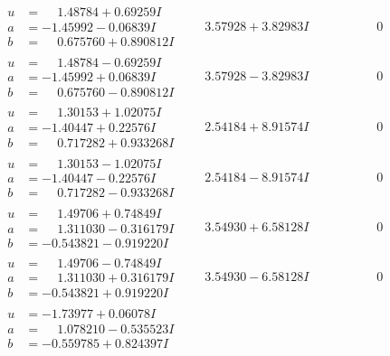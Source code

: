 \documentclass[1p]{elsarticle_modified}
\theoremstyle{definition}
\begin{document}
$$\begin{array}{c|c|c}
\begin{aligned}
u &= \phantom{-}1.48784 + 0.69259 I \\
a &= -1.45992 - 0.06839 I \\
b &= \phantom{-}0.675760 + 0.890812 I\end{aligned}
 & \phantom{-}3.57928 + 3.82983 I & \phantom{-0.000000 } 0 \\ \hline\begin{aligned}
u &= \phantom{-}1.48784 - 0.69259 I \\
a &= -1.45992 + 0.06839 I \\
b &= \phantom{-}0.675760 - 0.890812 I\end{aligned}
 & \phantom{-}3.57928 - 3.82983 I & \phantom{-0.000000 } 0 \\ \hline\begin{aligned}
u &= \phantom{-}1.30153 + 1.02075 I \\
a &= -1.40447 + 0.22576 I \\
b &= \phantom{-}0.717282 + 0.933268 I\end{aligned}
 & \phantom{-}2.54184 + 8.91574 I & \phantom{-0.000000 } 0 \\ \hline\begin{aligned}
u &= \phantom{-}1.30153 - 1.02075 I \\
a &= -1.40447 - 0.22576 I \\
b &= \phantom{-}0.717282 - 0.933268 I\end{aligned}
 & \phantom{-}2.54184 - 8.91574 I & \phantom{-0.000000 } 0 \\ \hline\begin{aligned}
u &= \phantom{-}1.49706 + 0.74849 I \\
a &= \phantom{-}1.311030 - 0.316179 I \\
b &= -0.543821 - 0.919220 I\end{aligned}
 & \phantom{-}3.54930 + 6.58128 I & \phantom{-0.000000 } 0 \\ \hline\begin{aligned}
u &= \phantom{-}1.49706 - 0.74849 I \\
a &= \phantom{-}1.311030 + 0.316179 I \\
b &= -0.543821 + 0.919220 I\end{aligned}
 & \phantom{-}3.54930 - 6.58128 I & \phantom{-0.000000 } 0 \\ \hline\begin{aligned}
u &= -1.73977 + 0.06078 I \\
a &= \phantom{-}1.078210 - 0.535523 I \\
b &= -0.559785 + 0.824397 I\end{aligned}

\end{array}$$
\end{document}
